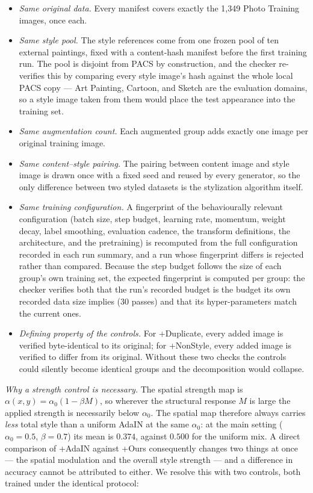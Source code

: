 \begin{itemize}
\item \textit{Same original data.} Every manifest covers exactly the 1{,}349 Photo Training images, once each.
\item \textit{Same style pool.} The style references come from one frozen pool of ten external paintings, fixed with a content-hash manifest before the first training run. The pool is disjoint from PACS by construction, and the checker re-verifies this by comparing every style image's hash against the whole local PACS copy --- Art Painting, Cartoon, and Sketch are the evaluation domains, so a style image taken from them would place the test appearance into the training set.
\item \textit{Same augmentation count.} Each augmented group adds exactly one image per original training image.
\item \textit{Same content--style pairing.} The pairing between content image and style image is drawn once with a fixed seed and reused by every generator, so the only difference between two styled datasets is the stylization algorithm itself.
\item \textit{Same training configuration.} A fingerprint of the behaviourally relevant configuration (batch size, step budget, learning rate, momentum, weight decay, label smoothing, evaluation cadence, the transform definitions, the architecture, and the pretraining) is recomputed from the full configuration recorded in each run summary, and a run whose fingerprint differs is rejected rather than compared. Because the step budget follows the size of each group's own training set, the expected fingerprint is computed per group: the checker verifies both that the run's recorded budget is the budget its own recorded data size implies (30 passes) and that its hyper-parameters match the current ones.
\item \textit{Defining property of the controls.} For +Duplicate, every added image is verified byte-identical to its original; for +NonStyle, every added image is verified to differ from its original. Without these two checks the controls could silently become identical groups and the decomposition would collapse.
\end{itemize}

\textit{Why a strength control is necessary.} The spatial strength map is $\alpha(x,y) = \alpha_0(1-\beta M)$, so wherever the structural response $M$ is large the applied strength is necessarily below $\alpha_0$. The spatial map therefore always carries \emph{less} total style than a uniform AdaIN at the same $\alpha_0$: at the main setting ($\alpha_0 = 0.5$, $\beta = 0.7$) its mean is $0.374$, against $0.500$ for the uniform mix. A direct comparison of +AdaIN against +Ours consequently changes two things at once --- the spatial modulation and the overall style strength --- and a difference in accuracy cannot be attributed to either. We resolve this with two controls, both trained under the identical protocol:

